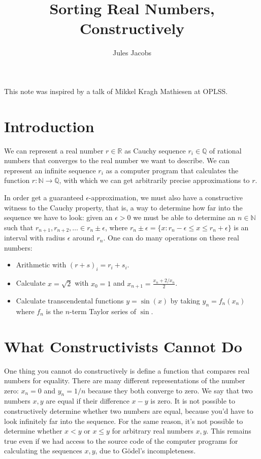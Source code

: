 \documentclass[a4paper, 11pt]{article}
\title{Sorting Real Numbers, Constructively}
\author{Jules Jacobs}
\newcommand{\N}{\mathbb{N}}
\newcommand{\Q}{\mathbb{Q}}
\newcommand{\R}{\mathbb{R}}
\begin{document}
\maketitle

This note was inspired by a talk of Mikkel Kragh Mathiesen at OPLSS.

\section{Introduction}

We can represent a real number $r\in \R$ as Cauchy sequence $r_i \in \Q$ of rational numbers that converges to the real number we want to describe. We can represent an infinite sequence $r_i$ as a computer program that calculates the function $r : \N \to \Q$, with which we can get arbitrarily precise approximations to $r$.

In order get a guaranteed $\epsilon$-approximation, we must also have a constructive witness to the Cauchy property, that is, a way to determine how far into the sequence we have to look: given an $\epsilon > 0$ we must be able to determine an $n \in \N$ such that $r_{n+1},r_{n+2},\dots \in r_n \pm \epsilon$, where $r_n \pm \epsilon = \{x : r_n - \epsilon \leq x \leq r_n + \epsilon \}$ is an interval with radius $\epsilon$ around $r_n$. One can do many operations on these real numbers:
\begin{itemize}
  \item Arithmetic with $(r+s)_i = r_i + s_i$.
  \item Calculate $x = \sqrt{2}$ with $x_0 = 1$ and $x_{n+1} = \frac{x_n + 2/x_n}{2}$.
  \item Calculate transcendental functions $y = \sin(x)$ by taking $y_n = f_n(x_n)$ where $f_n$ is the $n$-term Taylor series of $\sin$.
\end{itemize}

\section{What Constructivists Cannot Do}

One thing you cannot do constructively is define a function that compares real numbers for equality. There are many different representations of the number zero: $x_n = 0$ and $y_n = 1/n$ because they both converge to zero. We say that two numbers $x,y$ are equal if their difference $x-y$ is zero. It is not possible to constructively determine whether two numbers are equal, because you'd have to look infinitely far into the sequence. For the same reason, it's not possible to determine whether $x < y$ or $x \leq y$ for arbitrary real numbers $x,y$. This remains true even if we had access to the source code of the computer programs for calculating the sequences $x,y$, due to Gödel's incompleteness.
\end{document}
